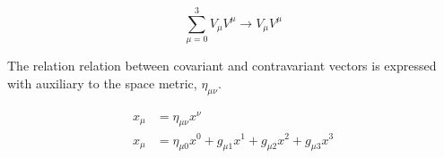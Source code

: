 \documentclass[12pt]{article}
\begin{document}
\begin{equation}
\sum_{\mu=0}^{3}  V_\mu V^\mu \longrightarrow V_\mu V^\mu
\end{equation}

The relation relation between covariant and contravariant vectors is expressed with auxiliary to the space metric, $\eta_{\mu \nu}$. \cite{ryder1996quantum}

\begin{align} 
x_\mu & =  \eta_{\mu \nu} x^\nu  \\ 
x_\mu & =  \eta_{\mu 0} x^0  + g_{\mu 1} x^1  + g_{\mu 2} x^2 + g_{\mu 3} x^3  
\end{align}
\newpage




	
\end{document}
